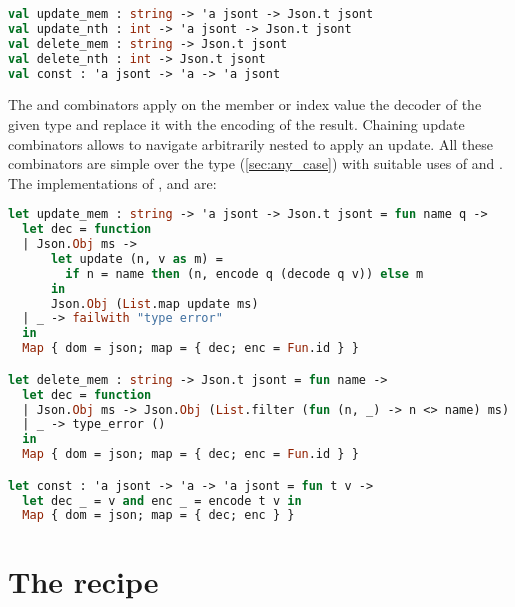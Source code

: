 \documentclass[nolinenum]{jfp}
\begin{document}
\begin{lstlisting}[language=ocaml]
val update_mem : string -> 'a jsont -> Json.t jsont
val update_nth : int -> 'a jsont -> Json.t jsont
val delete_mem : string -> Json.t jsont
val delete_nth : int -> Json.t jsont
val const : 'a jsont -> 'a -> 'a jsont
\end{lstlisting}
%
The  and  combinators apply
on the member or index value the decoder of the given \json{} type
and replace it with the encoding of the result. Chaining update
combinators allows to navigate arbitrarily nested \json{} to apply an
update. All these combinators are simple  over the \json{}
type  (\autoref{sec:any_case}) with suitable uses of
 and . The implementations of
,  and  are:

\begin{lstlisting}[language=ocaml]
let update_mem : string -> 'a jsont -> Json.t jsont = fun name q ->
  let dec = function
  | Json.Obj ms ->
      let update (n, v as m) =
        if n = name then (n, encode q (decode q v)) else m
      in
      Json.Obj (List.map update ms)
  | _ -> failwith "type error"
  in
  Map { dom = json; map = { dec; enc = Fun.id } }

let delete_mem : string -> Json.t jsont = fun name ->
  let dec = function
  | Json.Obj ms -> Json.Obj (List.filter (fun (n, _) -> n <> name) ms)
  | _ -> type_error ()
  in
  Map { dom = json; map = { dec; enc = Fun.id } }

let const : 'a jsont -> 'a -> 'a jsont = fun t v ->
  let dec _ = v and enc _ = encode t v in
  Map { dom = json; map = { dec; enc } }
\end{lstlisting}
\section{The recipe}
\label{sec:recipe}
\end{document}
